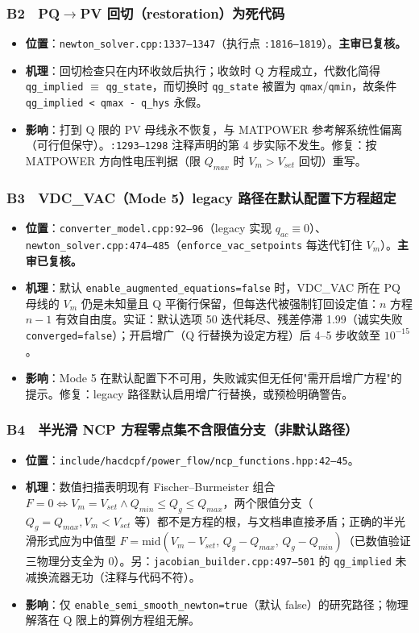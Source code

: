 \documentclass[11pt,a4paper,fontset=fandol]{ctexart}
\newcommand{\file}[1]{\texttt{#1}}
\begin{document}
\subsubsection*{B2　PQ$\to$PV 回切（restoration）为死代码}
\begin{itemize}
  \item \textbf{位置}：\file{newton\_solver.cpp:1337--1347}（执行点 \file{:1816--1819}）。\textbf{主审已复核。}
  \item \textbf{机理}：回切检查只在内环收敛后执行；收敛时 Q 方程成立，代数化简得 \texttt{qg\_implied} $\equiv$ \texttt{qg\_state}，而切换时 \texttt{qg\_state} 被置为 \texttt{qmax}/\texttt{qmin}，故条件 \texttt{qg\_implied < qmax - q\_hys} 永假。
  \item \textbf{影响}：打到 Q 限的 PV 母线永不恢复，与 MATPOWER 参考解系统性偏离（可行但保守）。\file{:1293--1298} 注释声明的第 4 步实际不发生。修复：按 MATPOWER 方向性电压判据（限 $Q_{max}$ 时 $V_m>V_{set}$ 回切）重写。
\end{itemize}

\subsubsection*{B3　VDC\_VAC（Mode 5）legacy 路径在默认配置下方程超定}
\begin{itemize}
  \item \textbf{位置}：\file{converter\_model.cpp:92--96}（legacy 实现 $q_{ac}\equiv 0$）、\file{newton\_solver.cpp:474--485}（\file{enforce\_vac\_setpoints} 每迭代钉住 $V_m$）。\textbf{主审已复核。}
  \item \textbf{机理}：默认 \texttt{enable\_augmented\_equations=false} 时，VDC\_VAC 所在 PQ 母线的 $V_m$ 仍是未知量且 Q 平衡行保留，但每迭代被强制钉回设定值：$n$ 方程 $n-1$ 有效自由度。实证：默认选项 50 迭代耗尽、残差停滞 1.99（诚实失败 \texttt{converged=false}）；开启增广（Q 行替换为设定方程）后 4--5 步收敛至 $10^{-15}$。
  \item \textbf{影响}：Mode 5 在默认配置下不可用，失败诚实但无任何"需开启增广方程"的提示。修复：legacy 路径默认启用增广行替换，或预检明确警告。
\end{itemize}

\subsubsection*{B4　半光滑 NCP 方程零点集不含限值分支（非默认路径）}
\begin{itemize}
  \item \textbf{位置}：\file{include/hacdcpf/power\_flow/ncp\_functions.hpp:42--45}。
  \item \textbf{机理}：数值扫描表明现有 Fischer--Burmeister 组合 $F=0 \iff V_m=V_{set}\wedge Q_{min}\le Q_g\le Q_{max}$，两个限值分支（$Q_g=Q_{max}, V_m<V_{set}$ 等）都不是方程的根，与文档串直接矛盾；正确的半光滑形式应为中值型 $F=\mathrm{mid}(V_m-V_{set},\,Q_g-Q_{max},\,Q_g-Q_{min})$（已数值验证三物理分支全为 0）。另：\file{jacobian\_builder.cpp:497--501} 的 \texttt{qg\_implied} 未减换流器无功（注释与代码不符）。
  \item \textbf{影响}：仅 \texttt{enable\_semi\_smooth\_newton=true}（默认 false）的研究路径；物理解落在 Q 限上的算例方程组无解。
\end{itemize}
\end{document}

